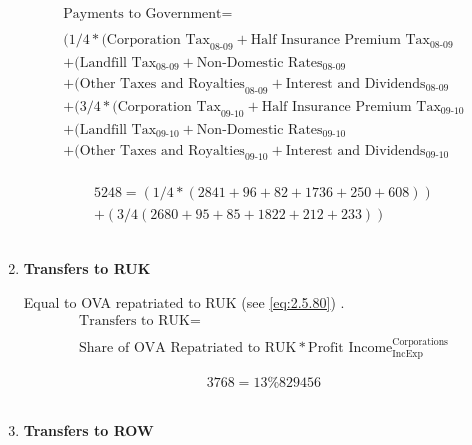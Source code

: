 \begin{enumerate}
\begin{equation}
\begin{split}
\text{Payments to Government} =  \\ \\
(1/4*(\text{Corporation Tax}_\text{08-09}+\text{Half Insurance Premium Tax}_\text{08-09}\\
+(\text{Landfill Tax}_\text{08-09}+\text{Non-Domestic Rates}_\text{08-09}\\
+(\text{Other Taxes and Royalties}_\text{08-09}+\text{Interest and Dividends}_\text{08-09}\\
+(3/4*(\text{Corporation Tax}_\text{09-10}+\text{Half Insurance Premium Tax}_\text{09-10}\\
+(\text{Landfill Tax}_\text{09-10}+\text{Non-Domestic Rates}_\text{09-10}\\
+(\text{Other Taxes and Royalties}_\text{09-10}+\text{Interest and Dividends}_\text{09-10}\\
\end{split} \label{eq:2.5.30}
\end{equation}

\begin{equation} \nonumber
\begin{split}
5248 = (1/4*(2841+96+82+1736+250+608))\\
+(3/4(2680+95+85+1822+212+233))
\end{split}
\end{equation}\\


\item \textbf {Transfers to RUK}

Equal to OVA repatriated to RUK (see \ref{eq:2.5.80}) \cite{ScotGov2012}.\\

\begin{equation}
\begin{split}
\text{Transfers to RUK} =  \\ \\
\text{Share of OVA Repatriated to RUK}*\text{Profit Income}^\text{Corporations}_\text{IncExp}
\end{split} \label{eq:2.5.31}
\end{equation}

\begin{equation} \nonumber
3768 = 13\%829456
\end{equation}\\


\item \textbf {Transfers to ROW}


\end{enumerate}
